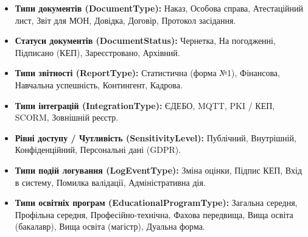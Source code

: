 \documentclass{article}
\begin{document}
\begin{itemize}
    \item \textbf{Типи документів (DocumentType):} Наказ, Особова справа, Атестаційний лист, Звіт для МОН, Довідка, Договір, Протокол засідання.
    \item \textbf{Статуси документів (DocumentStatus):} Чернетка, На погодженні, Підписано (КЕП), Зареєстровано, Архівний.
    \item \textbf{Типи звітності (ReportType):} Статистична (форма №1), Фінансова, Навчальна успешність, Контингент, Кадрова.
    \item \textbf{Типи інтеграцій (IntegrationType):} ЄДЕБО, MQTT, PKI / КЕП, SCORM, Зовнішній реєстр.
    \item \textbf{Рівні доступу / Чутливість (SensitivityLevel):} Публічний, Внутрішній, Конфіденційний, Персональні дані (GDPR).
    \item \textbf{Типи подій логування (LogEventType):} Зміна оцінки, Підпис КЕП, Вхід в систему, Помилка валідації, Адміністративна дія.
    \item \textbf{Типи освітніх програм (EducationalProgramType):} Загальна середня, Профільна середня, Професійно-технічна, Фахова передвища, Вища освіта (бакалавр), Вища освіта (магістр), Дуальна форма.
\end{itemize}
\end{document}
